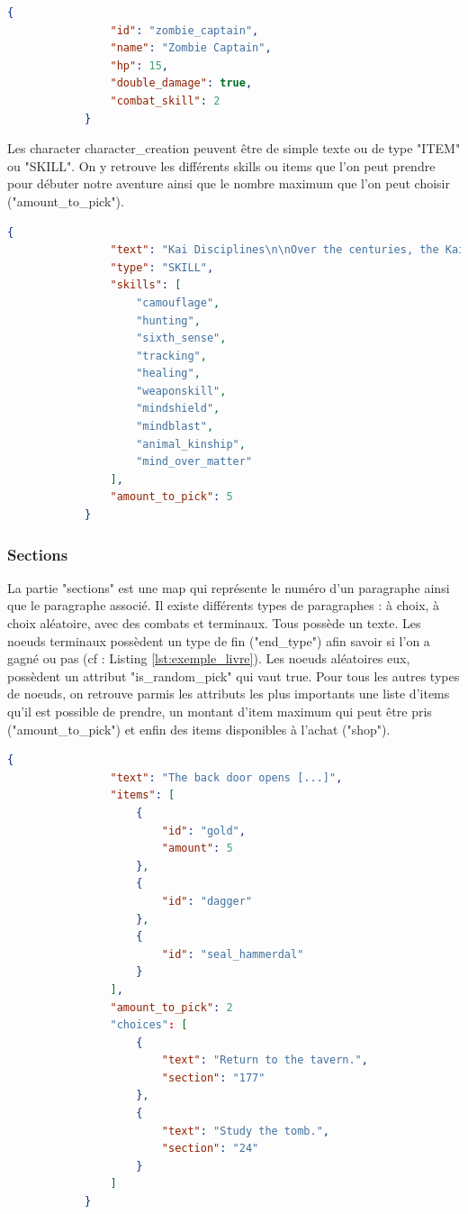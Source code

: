			\begin{lstlisting}[gobble=12, language=json, caption=Exemple de personnage]
			{
				"id": "zombie_captain",
				"name": "Zombie Captain",
				"hp": 15,
				"double_damage": true,
				"combat_skill": 2
			}
			\end{lstlisting}

			Les character character\_creation peuvent être de simple texte ou de type "ITEM" ou "SKILL". On y retrouve les différents skills ou items que l'on peut prendre pour débuter notre aventure ainsi que le nombre maximum que l'on peut choisir ("amount\_to\_pick").

			\begin{lstlisting}[gobble=12, language=json, caption=Exemple de character\_creation]
			{
				"text": "Kai Disciplines\n\nOver the centuries, the Kai monks have mastered the skills of the warrior. These skills are known as the Kai Disciplines, [...]",
				"type": "SKILL",
				"skills": [
					"camouflage",
					"hunting",
					"sixth_sense",
					"tracking",
					"healing",
					"weaponskill",
					"mindshield",
					"mindblast",
					"animal_kinship",
					"mind_over_matter"
				],
				"amount_to_pick": 5
			}
			\end{lstlisting}

		\subsubsection{Sections}

			La partie "sections" est une map qui représente le numéro d'un paragraphe ainsi que le paragraphe associé. Il existe différents types de paragraphes : à choix, à choix aléatoire, avec des combats et terminaux. Tous possède un texte. Les noeuds terminaux possèdent un type de fin ("end\_type") afin savoir si l'on a gagné ou pas (cf : Listing \ref{lst:exemple_livre}). Les noeuds aléatoires eux, possèdent un attribut "is\_random\_pick" qui vaut true. Pour tous les autres types de noeuds, on retrouve parmis les attributs les plus importants une liste d'items qu'il est possible de prendre, un montant d'item maximum qui peut être pris ("amount\_to\_pick") et enfin des items disponibles à l'achat ("shop").

			\begin{lstlisting}[gobble=12, language=json, caption=Exemple de paragraphe]
			{
				"text": "The back door opens [...]",
				"items": [
					{
						"id": "gold",
						"amount": 5
					},
					{
						"id": "dagger"
					},
					{
						"id": "seal_hammerdal"
					}
				],
				"amount_to_pick": 2
				"choices": [
					{
						"text": "Return to the tavern.",
						"section": "177"
					},
					{
						"text": "Study the tomb.",
						"section": "24"
					}
				]
			}
			\end{lstlisting}

